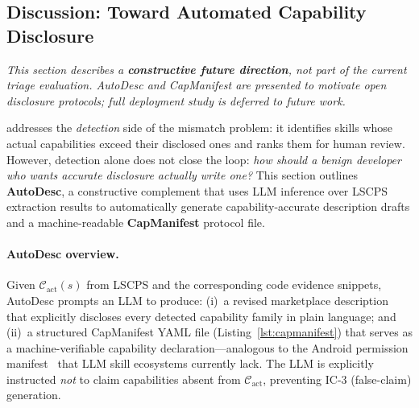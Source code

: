 \subsection{Discussion: Toward Automated Capability Disclosure}
\label{sec:autodesc}

\noindent\textit{This section describes a \textbf{constructive future direction},
not part of the current \sysname triage evaluation.
AutoDesc and CapManifest are presented to motivate open disclosure protocols;
full deployment study is deferred to future work.}

\medskip
\sysname addresses the \emph{detection} side of the mismatch problem:
it identifies skills whose actual capabilities exceed their disclosed ones
and ranks them for human review.
However, detection alone does not close the loop:
\emph{how should a benign developer who wants accurate disclosure actually write one?}
This section outlines \textbf{AutoDesc}, a constructive complement
that uses LLM inference over LSCPS extraction results to automatically
generate capability-accurate description drafts and a machine-readable
\textbf{CapManifest} protocol file.

\paragraph{AutoDesc overview.}
Given $\mathcal{C}_{\text{act}}(s)$ from LSCPS and the corresponding
code evidence snippets, AutoDesc prompts an LLM to produce:
(i)~a revised marketplace description that explicitly discloses every
detected capability family in plain language; and
(ii)~a structured CapManifest YAML file (Listing~\ref{lst:capmanifest})
that serves as a machine-verifiable capability declaration---analogous
to the Android permission manifest~\cite{felt2011android} that LLM
skill ecosystems currently lack.
The LLM is explicitly instructed \emph{not} to claim capabilities
absent from $\mathcal{C}_{\text{act}}$, preventing IC-3 (false-claim) generation.

